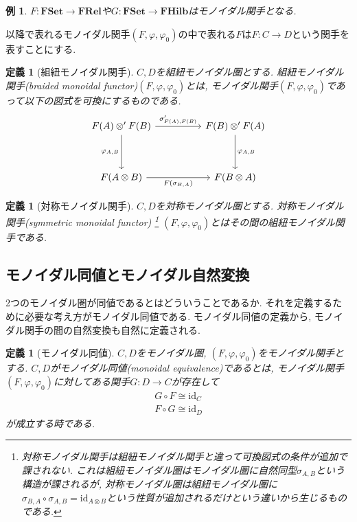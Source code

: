 \documentclass[a4paper,12pt]{ltjsarticle}
\theoremstyle{break}
\newtheorem{defn}[thm]{定義}
\newtheorem{eg}[thm]{例}
\newcommand{\fset}{\mathbf{FSet}}
\newcommand{\frel}{\mathbf{FRel}}
\newcommand{\fhilb}{\mathbf{FHilb}}
\newcommand{\id}{\mathrm{id}}
\newcommand{\ci}{\circ}
\newcommand{\si}{\sigma}
\newcommand{\vp}{\varphi}
\newcommand{\ot}{\otimes}
\numberwithin{equation}{section}
\begin{document}
\begin{eg}
  $F: \fset \to \frel$や$G: \fset \to \fhilb$はモノイダル関手となる. 
\end{eg}

以降で表れるモノイダル関手$(F,\vp,\vp_0)$の中で表れる$F$は$F: C \to D$という関手を表すことにする. 

\begin{defn}[組紐モノイダル関手]
  $C,D$を組紐モノイダル圏とする. 
  組紐モノイダル関手(braided monoidal functor)$(F,\vp,\vp_0)$とは, モノイダル関手$(F,\vp,\vp_0)$であって以下の図式を可換にするものである. 
  \[\begin{tikzcd}
    {F(A) \ot' F(B)} && {F(B) \ot' F(A)} \\
    \\
    {F(A \ot B)} && {F(B \ot A)}
    \arrow["{\si_{F(A),F(B)}'}", from=1-1, to=1-3]
    \arrow["{\vp_{A,B}}"', from=1-1, to=3-1]
    \arrow["{F(\si_{B,A})}"', from=3-1, to=3-3]
    \arrow["{\vp_{A,B}}", from=1-3, to=3-3]
  \end{tikzcd}\]
\end{defn}

\begin{defn}[対称モノイダル関手]
  $C,D$を対称モノイダル圏とする. 
  対称モノイダル関手(symmetric monoidal functor)
  \footnote{
    対称モノイダル関手は組紐モノイダル関手と違って可換図式の条件が追加で課されない. 
    これは組紐モノイダル圏はモノイダル圏に自然同型$\si_{A,B}$という構造が課されるが, 対称モノイダル圏は組紐モノイダル圏に$\si_{B,A} \ci \si_{A,B} = \id_{A \ot B}$という性質が追加されるだけという違いから生じるものである. 
  }
  $(F,\vp,\vp_0)$とはその間の組紐モノイダル関手である. 
\end{defn}

\subsection{モノイダル同値とモノイダル自然変換}

2つのモノイダル圏が同値であるとはどういうことであるか. 
それを定義するために必要な考え方がモノイダル同値である. 
モノイダル同値の定義から, モノイダル関手の間の自然変換も自然に定義される. 

\begin{defn}[モノイダル同値]
  $C,D$をモノイダル圏, $(F,\vp,\vp_0)$をモノイダル関手とする. 
  $C,D$がモノイダル同値(monoidal equivalence)であるとは, モノイダル関手$(F,\vp,\vp_0)$に対してある関手$G: D \to C$が存在して
  \begin{align*}
    G \ci F \cong \id_C \\
    F \ci G \cong \id_D
  \end{align*}  
  が成立する時である. 
\end{defn} 
\end{document}
